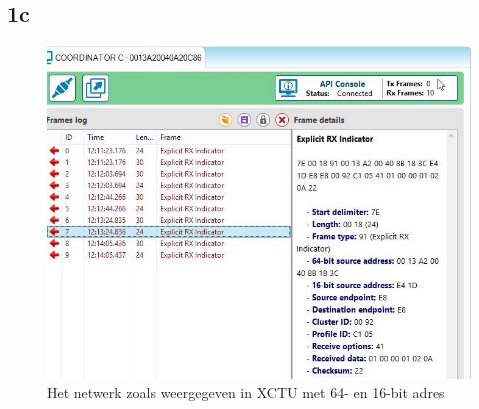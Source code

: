 \documentclass[12pt]{article}
\begin{document}
\subsection*{1c}
\begin{figure}[h]
\begin{center}
\includegraphics[scale=.8]{1c-een.jpg}
\caption{Het netwerk zoals weergegeven in XCTU met 64- en 16-bit adres}
\label{fig:api_net}
\end{center}
\end{figure}
\end{document}
